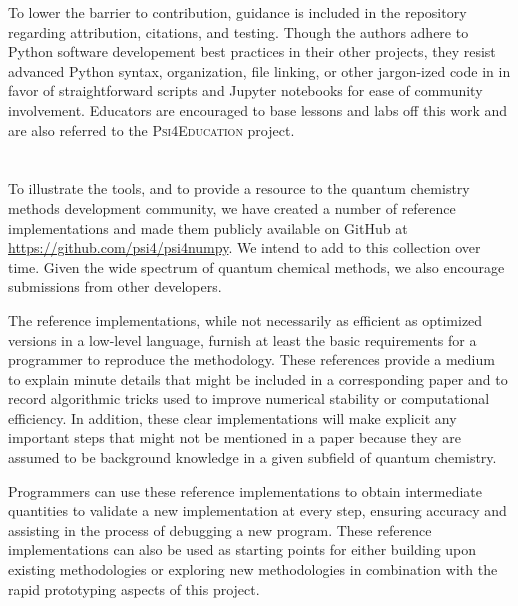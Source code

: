 To lower the barrier to contribution, guidance is included in the repository regarding attribution, citations, and testing. Though the authors adhere to Python software developement best practices in their other projects, they resist advanced Python syntax, organization, file linking, or other jargon-ized code in \pfn in favor of straightforward scripts and Jupyter notebooks for ease of community involvement.  Educators are encouraged to base lessons and labs off this work and are also referred to the \textsc{Psi4Education} project\cite{psi4edu}.

\section{\texorpdfstring{}{Reference Implementations}}

To illustrate the \pfn tools, and to provide a resource to the quantum chemistry methods development community, we have created a number of reference implementations and made them publicly available on GitHub at \url{https://github.com/psi4/psi4numpy}.  We intend to add to this collection over time.  Given the wide spectrum of quantum chemical methods, we also encourage submissions from other developers.

The \pfn reference implementations, while not necessarily as efficient as optimized versions in a low-level language, furnish at least the basic requirements for a programmer to reproduce the methodology. These references provide a medium to explain minute details that might be included in a corresponding paper and to record algorithmic tricks used to improve numerical stability or computational efficiency. In addition, these clear implementations will make explicit any important steps that might not be mentioned in a paper because they are assumed to be background knowledge in a given subfield of quantum chemistry.

Programmers can use these reference implementations to obtain intermediate quantities to validate a new implementation at every step, ensuring accuracy and assisting in the process of debugging a new program. These reference implementations can also be used as starting points for either building upon existing methodologies or exploring new methodologies in combination with the rapid prototyping aspects of this project.

